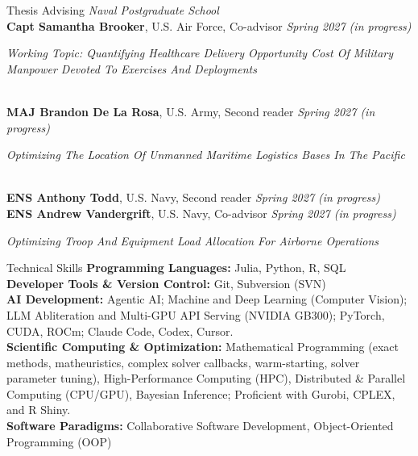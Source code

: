 \documentclass[
	11pt,
]{resume}
\begin{document}
\begin{minipage}{\linewidth}
\begin{rSection}{Thesis Advising}
    \vspace{0.5\baselineskip}
    \textit{Naval Postgraduate School} \medskip \\
    \textbf{Capt Samantha Brooker}, U.S. Air Force, Co-advisor \hfill \textit{Spring 2027 (in progress)} \\
    \hspace*{1em}\parbox[t]{\dimexpr\linewidth-1em\relax}{\textit{Working Topic: Quantifying Healthcare Delivery Opportunity Cost Of Military Manpower Devoted To Exercises And Deployments}} \\
    \textbf{MAJ Brandon De La Rosa}, U.S. Army, Second reader \hfill \textit{Spring 2027 (in progress)} \\
    \hspace*{1em}\parbox[t]{\dimexpr\linewidth-1em\relax}{\textit{Optimizing The Location Of Unmanned Maritime Logistics Bases In The Pacific}} \\
    \textbf{ENS Anthony Todd}, U.S. Navy, Second reader \hfill \textit{Spring 2027 (in progress)} \\
    \textbf{ENS Andrew Vandergrift}, U.S. Navy, Co-advisor \hfill \textit{Spring 2027 (in progress)} \\
    \hspace*{1em}\parbox[t]{\dimexpr\linewidth-1em\relax}{\textit{Optimizing Troop And Equipment Load Allocation For Airborne Operations}}
\end{rSection}
\end{minipage}

\begin{rSection}{Technical Skills}
    \textbf{Programming Languages:} Julia, Python, R, SQL \medskip \\
    \textbf{Developer Tools \& Version Control:} Git, Subversion (SVN) \medskip \\
    \textbf{AI Development:} Agentic AI; Machine and Deep Learning (Computer Vision); LLM Abliteration and Multi-GPU API Serving (NVIDIA GB300); PyTorch, CUDA, ROCm; Claude Code, Codex, Cursor. \medskip \\
    \textbf{Scientific Computing \& Optimization:} Mathematical Programming (exact methods, matheuristics, complex solver callbacks, warm-starting, solver parameter tuning), High-Performance Computing (HPC), Distributed \& Parallel Computing (CPU/GPU), Bayesian Inference; Proficient with Gurobi, CPLEX, and R Shiny. \medskip \\
    \textbf{Software Paradigms:} Collaborative Software Development, Object-Oriented Programming (OOP)
\end{rSection}
\end{document}

